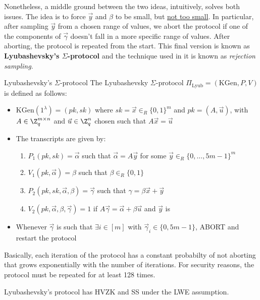 \documentclass[a4paper, 12pt]{report}
\begin{document}
    Nonetheless, a middle ground between the two ideas, intuitively, solves both issues. The idea is to force $\vec y$ and $\beta$ to be small, but \underline{not too small}. In particular, after sampling $\vec y$ from a chosen range of values, we abort the protocol if one of the components of $\vec \gamma$ doesn't fall in a more specific range of values. After aborting, the protocol is repeated from the start. This final version is known as \textbf{Lyubashevsky's $\Sigma$-protocol} and the technique used in it is known as \textit{rejection sampling}.

    \begin{framedalgo}{Lyubashevsky's $\Sigma$-protocol}
        The Lyubashevsky $\Sigma$-protocol $\Pi_{\text{Lyub}} = (\mathrm{KGen}, P, V)$ is defined as follows:
        \begin{itemize}
            \item $\mathrm{KGen}(1^\lambda) = (pk, sk)$ where $sk = \vec x \in_R \{0,1\}^m$ and $pk = (A, \vec u)$, with $A \in \Z_q^{m \times n}$ and $\vec u \in \Z_q^n$ chosen such that $A \vec x = \vec u$
            \item The transcripts are given by:
            \begin{enumerate}
                \item $P_1(pk,sk) = \vec \alpha$ such that $\vec \alpha = A \vec y$ for some $\vec y \in_R \{0,\ldots, 5m-1\}^m$
                \item $V_1(pk, \vec\alpha) = \beta$ such that $\beta \in_R \{0,1\}$
                \item $P_2(pk,sk,\vec\alpha, \beta) = \vec \gamma$ such that $\gamma = \beta \vec x + \vec y$
                \item $V_2(pk, \vec\alpha, \beta, \vec \gamma) = 1$ if $A \vec \gamma = \vec \alpha + \beta \vec u$ and $\vec y$ is 
            \end{enumerate}
            \item Whenever $\vec \gamma$ is such that $\exists i \in [m]$ with $\vec \gamma_i \in \{0, 5m-1\}$, ABORT and restart the protocol
        \end{itemize}
    \end{framedalgo}

    Basically, each iteration of the protocol has a constant probabilty of not aborting that grows exponentially with the number of iterations. For security reasons, the protocol must be repeated for at least 128 times. 

    \begin{framedprop}{}
        Lyubashevsky's protocol has HVZK and SS under the LWE assumption.
    \end{framedprop}
\end{document}
